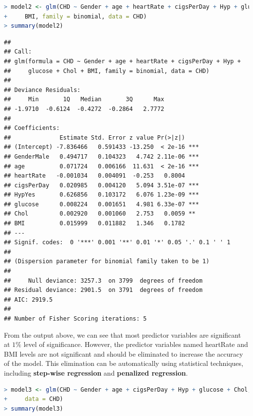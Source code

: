\documentclass[
]{article}
\begin{document}
\begin{lstlisting}[language=R]
> model2 <- glm(CHD ~ Gender + age + heartRate + cigsPerDay + Hyp + glucose + Chol +
+     BMI, family = binomial, data = CHD)
> summary(model2)
\end{lstlisting}

\begin{lstlisting}
## 
## Call:
## glm(formula = CHD ~ Gender + age + heartRate + cigsPerDay + Hyp + 
##     glucose + Chol + BMI, family = binomial, data = CHD)
## 
## Deviance Residuals: 
##     Min       1Q   Median       3Q      Max  
## -1.9710  -0.6124  -0.4272  -0.2864   2.7772  
## 
## Coefficients:
##              Estimate Std. Error z value Pr(>|z|)    
## (Intercept) -7.836466   0.591433 -13.250  < 2e-16 ***
## GenderMale   0.494717   0.104323   4.742 2.11e-06 ***
## age          0.071724   0.006166  11.631  < 2e-16 ***
## heartRate   -0.001034   0.004091  -0.253   0.8004    
## cigsPerDay   0.020985   0.004120   5.094 3.51e-07 ***
## HypYes       0.626856   0.103172   6.076 1.23e-09 ***
## glucose      0.008224   0.001651   4.981 6.33e-07 ***
## Chol         0.002920   0.001060   2.753   0.0059 ** 
## BMI          0.015999   0.011882   1.346   0.1782    
## ---
## Signif. codes:  0 '***' 0.001 '**' 0.01 '*' 0.05 '.' 0.1 ' ' 1
## 
## (Dispersion parameter for binomial family taken to be 1)
## 
##     Null deviance: 3257.3  on 3799  degrees of freedom
## Residual deviance: 2901.5  on 3791  degrees of freedom
## AIC: 2919.5
## 
## Number of Fisher Scoring iterations: 5
\end{lstlisting}

From the output above, we can see that most predictor variables are
significant at \(1\%\) level of significance. However, the predictor
variables named heartRate and BMI levels are not significant and should
be eliminated to increase the accuracy of the model. This elimination
can be automatically using statistical techniques, including
\textbf{step-wise regression} and \textbf{penalized regression}.

\begin{lstlisting}[language=R]
> model3 <- glm(CHD ~ Gender + age + cigsPerDay + Hyp + glucose + Chol, family = binomial,
+     data = CHD)
> summary(model3)
\end{lstlisting}
\end{document}
